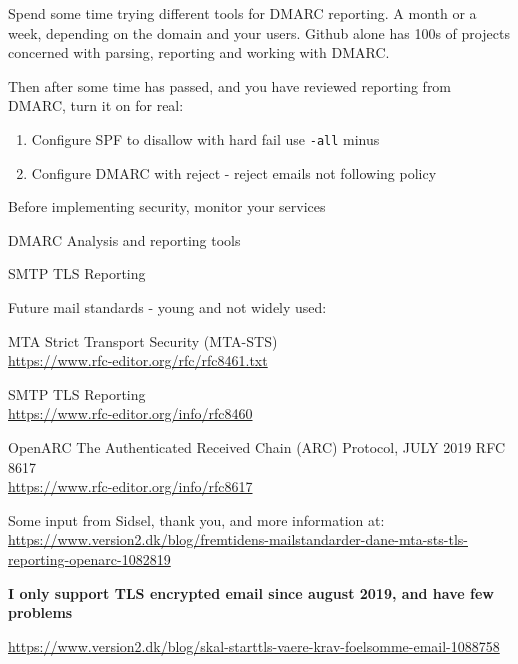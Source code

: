 \documentclass[Screen16to9,17pt]{foils}
\begin{document}

Spend some time trying different tools for DMARC reporting. A month or a week, depending on the domain and your users. Github alone has 100s of projects concerned with parsing, reporting and working with DMARC.

Then after some time has passed, and you have reviewed reporting from DMARC, turn it on for real:
\begin{enumerate}
\item Configure SPF to disallow with hard fail use \verb+-all+ minus
\item Configure DMARC with reject - reject emails not following policy
\end{enumerate}


\begin{list2}
\item Before implementing security, monitor your services
\item DMARC Analysis and reporting tools
\item SMTP TLS Reporting
\end{list2}



Future mail standards - young and not widely used:
\begin{list2}
\item MTA Strict Transport Security (MTA-STS)\\
\url{https://www.rfc-editor.org/rfc/rfc8461.txt}
\item SMTP TLS Reporting\\
\url{https://www.rfc-editor.org/info/rfc8460}
\item OpenARC The Authenticated Received Chain (ARC) Protocol, JULY 2019 RFC 8617\\
\url{https://www.rfc-editor.org/info/rfc8617}
\end{list2}

Some input from Sidsel, thank you, and more information at:\\{\footnotesize
\url{https://www.version2.dk/blog/fremtidens-mailstandarder-dane-mta-sts-tls-reporting-openarc-1082819}}

\vskip 5mm
\centerline{\bf I only support TLS encrypted email since august 2019, and have few problems}
\url{https://www.version2.dk/blog/skal-starttls-vaere-krav-foelsomme-email-1088758}

\end{document}
